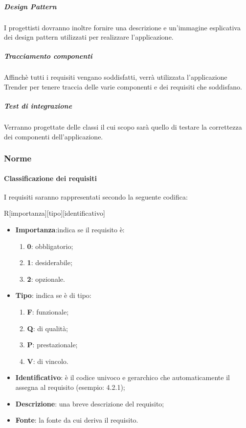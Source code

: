 			\subparagraph{Design Pattern}
			\label{sec:2.1.1.2.2}
				I progettisti dovranno inoltre fornire una descrizione e un'immagine esplicativa dei design pattern utilizzati per realizzare l'applicazione.
				
			\subparagraph{Tracciamento componenti}
			\label{sec:2.1.1.2.3}
				Affinchè tutti i requisiti vengano soddisfatti, verrà utilizzata l'applicazione Trender per tenere traccia delle varie componenti e dei requisiti che soddisfano.
				
			\subparagraph{Test di integrazione}
			\label{sec:2.1.1.2.4}
				Verranno progettate delle classi il cui scopo sarà quello di testare la correttezza dei componenti dell'applicazione.
			
		
\subsubsection{Norme}
\label{sec:2.1.2}
	\paragraph{Classificazione  dei requisiti}
	\label{sec:2.1.2.1}
		I requisiti saranno rappresentati secondo la seguente codifica:
		\begin{center}
			R[importanza][tipo][identificativo]
		\end{center}
		\begin{itemize}
			\item \textbf{Importanza}:indica se il requisito è:
			\begin{enumerate}
				\item \textbf{0}: obbligatorio;
				\item \textbf{1}: desiderabile;
				\item \textbf{2}: opzionale.
			\end{enumerate}
			\item \textbf{Tipo}: indica se è di tipo:
			\begin{enumerate}
				\item \textbf{F}: funzionale;
				\item \textbf{Q}: di qualità;
				\item \textbf{P}: prestazionale;
				\item \textbf{V}: di vincolo.
			\end{enumerate}
			\item \textbf{Identificativo}: è il codice univoco e gerarchico che automaticamente il  assegna al requisito (esempio: 4.2.1);
			\item \textbf{Descrizione}: una breve descrizione del requisito;
			\item \textbf{Fonte}: la fonte da cui deriva il requisito.
		\end{itemize}
